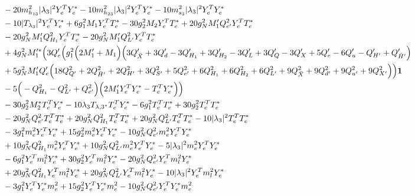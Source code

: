 {\begin{align}
 &-20 m_{h_{13}}^2 |\lambda_3|^2 {Y_{e}^{T}  Y_e^*} -10 m_{h_{23}}^2 |\lambda_3|^2 {Y_{e}^{T}  Y_e^*} -10 m_{s_3}^2 |\lambda_3|^2 {Y_{e}^{T}  Y_e^*} \nonumber \\ 
 &-10 |T_{\lambda_3}|^2 {Y_{e}^{T}  Y_e^*} +6 g_{1}^{2} M_1 {Y_{e}^{T}  T_e^*} -30 g_{2}^{2} M_2 {Y_{e}^{T}  T_e^*} +20 g_{N}^{2} M_1' Q_{e'}^{2} {Y_{e}^{T}  T_e^*} \nonumber \\ 
 &-20 g_{N}^{2} M_1' Q_{H_1}^{2} {Y_{e}^{T}  T_e^*} -20 g_{N}^{2} M_1' Q_{L'}^{2} {Y_{e}^{T}  T_e^*} \nonumber \\ 
 &+4 g_{N}^{2} M_1'^* \Big(3 Q_e' \Big(g_{1}^{2} \Big(2 M_1'  + M_1\Big)\Big(3 Q_{\bar{X}}'  + 3 Q_d'  -3 Q_{H_1}'  + 3 Q_{H_2}'  -3 Q_L'  + 3 Q_Q'  -3 Q_X'  + 5 Q_e'  -6 Q_u'  - Q_{H'}'  + Q_{\bar{H}'}'\Big)\nonumber \\ 
 &+5 g_{N}^{2} M_1' Q_e' \Big(18 Q_{Q'}^{2}  + 2 Q_{\bar{H}'}^{2}  + 2 Q_{H'}^{2}  + 3 Q_{S'}^{2}  + 5 Q_{e'}^{2}  + 6 Q_{H_1}^{2}  + 6 Q_{H_2}^{2}  + 6 Q_{L'}^{2}  + 9 Q_{\bar{X}}^{2}  + 9 Q_{d'}^{2}  + 9 Q_{u'}^{2}  + 9 Q_{X'}^{2} \Big)\Big){\bf 1} \nonumber \\ 
 &-5 \Big(- Q_{H_1}^{2}  - Q_{L'}^{2}  + Q_{e'}^{2}\Big)\Big(2 M_1' {Y_{e}^{T}  Y_e^*}  - {T_{e}^{T}  Y_e^*} \Big)\Big)\nonumber \\ 
 &-30 g_{2}^{2} M_2^* {T_{e}^{T}  Y_e^*} -10 \lambda_3 T_{{\lambda,3}^*} {T_{e}^{T}  Y_e^*} -6 g_{1}^{2} {T_{e}^{T}  T_e^*} +30 g_{2}^{2} {T_{e}^{T}  T_e^*} \nonumber \\ 
 &-20 g_{N}^{2} Q_{e'}^{2} {T_{e}^{T}  T_e^*} +20 g_{N}^{2} Q_{H_1}^{2} {T_{e}^{T}  T_e^*} +20 g_{N}^{2} Q_{L'}^{2} {T_{e}^{T}  T_e^*} -10 |\lambda_3|^2 {T_{e}^{T}  T_e^*} \nonumber \\ 
 &-3 g_{1}^{2} {m_e^2  Y_{e}^{T}  Y_e^*} +15 g_{2}^{2} {m_e^2  Y_{e}^{T}  Y_e^*} -10 g_{N}^{2} Q_{e'}^{2} {m_e^2  Y_{e}^{T}  Y_e^*} \nonumber \\ 
 &+10 g_{N}^{2} Q_{H_1}^{2} {m_e^2  Y_{e}^{T}  Y_e^*} +10 g_{N}^{2} Q_{L'}^{2} {m_e^2  Y_{e}^{T}  Y_e^*} -5 |\lambda_3|^2 {m_e^2  Y_{e}^{T}  Y_e^*} \nonumber \\ 
 &-6 g_{1}^{2} {Y_{e}^{T}  m_l^2  Y_e^*} +30 g_{2}^{2} {Y_{e}^{T}  m_l^2  Y_e^*} -20 g_{N}^{2} Q_{e'}^{2} {Y_{e}^{T}  m_l^2  Y_e^*} \nonumber \\ 
 &+20 g_{N}^{2} Q_{H_1}^{2} {Y_{e}^{T}  m_l^2  Y_e^*} +20 g_{N}^{2} Q_{L'}^{2} {Y_{e}^{T}  m_l^2  Y_e^*} -10 |\lambda_3|^2 {Y_{e}^{T}  m_l^2  Y_e^*} \nonumber \\ 
 &-3 g_{1}^{2} {Y_{e}^{T}  Y_e^*  m_e^2} +15 g_{2}^{2} {Y_{e}^{T}  Y_e^*  m_e^2} -10 g_{N}^{2} Q_{e'}^{2} {Y_{e}^{T}  Y_e^*  m_e^2} \nonumber \\ 

\end{align}}
